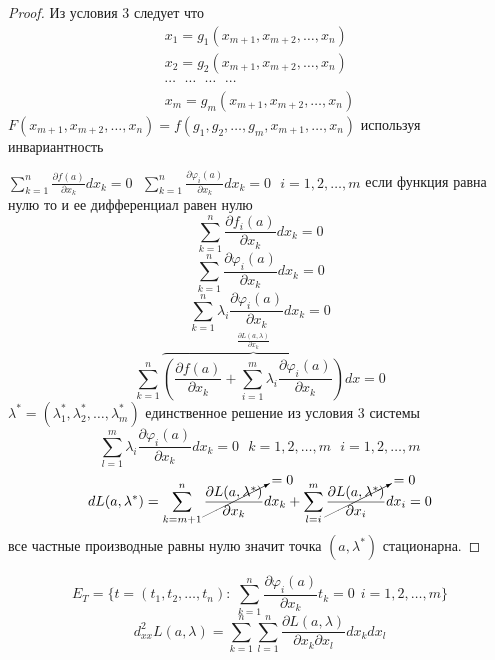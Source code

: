 \begin{proof}
  Из условия 3 следует что
  $$
  \begin{array}{c}
    x_1 = g_1(x_{m+1}, x_{m+2}, \ldots, x_n) \\
    x_2 = g_2(x_{m+1}, x_{m+2}, \ldots, x_n) \\
    \cdots ~~~ \cdots ~~~ \cdots ~~~ \cdots \\
    x_m = g_m(x_{m+1}, x_{m+2}, \ldots, x_n)
  \end{array}
  $$
  $F(x_{m+1}, x_{m+2}, \ldots, x_n) = f(g_1, g_2, \ldots, g_m, x_{m+1},
  \ldots, x_n)$ используя инвариантность

  $\sum_{k=1}^n \frac{\partial f(a)}{\partial x_k} dx_k = 0 ~~~
  \sum_{k=1}^n \frac{\partial \varphi_i(a)}{\partial x_k} dx_k = 0 ~~~
  i = 1, 2, \ldots, m$ если функция равна нулю то и ее дифференциал равен нулю
  $$
  \sum_{k=1}^n \frac{\partial f_i(a)}{\partial x_k} dx_k = 0
  $$
  $$
  \sum_{k=1}^n \frac{\partial \varphi_i(a)}{\partial x_k} dx_k = 0
  $$
  $$
  \sum_{k=1}^n \lambda_i \frac{\partial \varphi_i(a)}{\partial x_k} dx_k = 0
  $$
  $$
  \sum_{k=1}^n \overbrace{\left( \frac{\partial f(a)}{\partial x_k} +
  \sum_{i=1}^m \lambda_i \frac{\partial \varphi_i(a)}{\partial x_k}
  \right)}^{\frac{\partial L(a, \lambda)}{\partial x_k}}dx = 0
  $$
  $\lambda^* = (\lambda_1^*, \lambda_2^*, \ldots, \lambda_m^*)$ единственное
  решение из условия 3 системы
  $$
  \sum_{l=1}^m \lambda_i \frac{\partial \varphi_i(a)}{\partial x_k} dx_k = 0
  ~~~ k = 1,2,\ldots, m ~~~ i = 1,2,\ldots, m
  $$
  $$
  dL(a, \lambda^*) = \sum_{k = m+1}^n \cancelto{= 0}{\frac{\partial
  L(a, \lambda^*)}{\partial x_k}} dx_k + \sum_{l=i}^m \cancelto{= 0}{\frac{
  \partial L(a, \lambda^*)}{\partial x_i}}dx_i = 0
  $$
  все частные производные равны нулю значит точка $(a, \lambda^*)$ стационарна.
\end{proof}

\begin{define}
  $$
  E_T = \{t = (t_1, t_2, \ldots, t_n): ~ \sum_{k=1}^n
  \frac{\partial \varphi_i(a)}{\partial x_k} t_k = 0 ~~ i = 1,2,\ldots,m\}
  $$
  $$
  d_{xx}^2 L(a, \lambda) = \sum_{k=1}^n \sum_{l=1}^n
  \frac{\partial L(a, \lambda)}{\partial x_k \partial x_l} dx_k dx_l
  $$
\end{define}

